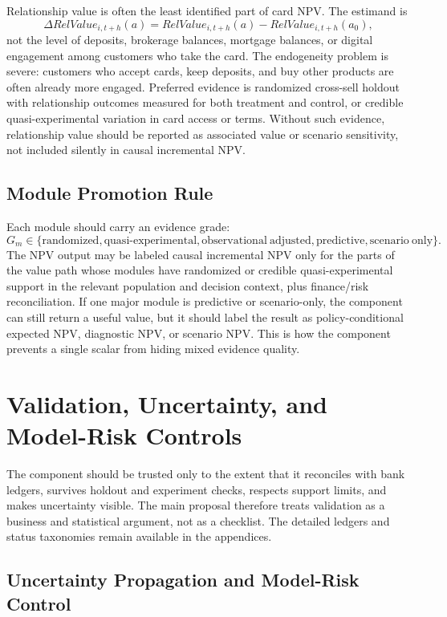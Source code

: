 \documentclass[11pt]{article}
\newcommand{\1}{\mathbf{1}}
\begin{document}
Relationship value is often the least identified part of card NPV. The
estimand is
\[
  \Delta RelValue_{i,t+h}(a)
  =
  RelValue_{i,t+h}(a)-RelValue_{i,t+h}(a_0),
\]
not the level of deposits, brokerage balances, mortgage balances, or digital
engagement among customers who take the card. The endogeneity problem is
severe: customers who accept cards, keep deposits, and buy other products are
often already more engaged. Preferred evidence is randomized cross-sell
holdout with relationship outcomes measured for both treatment and control, or
credible quasi-experimental variation in card access or terms. Without such
evidence, relationship value should be reported as associated value or
scenario sensitivity, not included silently in causal incremental NPV.

\subsection*{Module Promotion Rule}

Each module should carry an evidence grade:
\[
  G_m\in
  \{\mathrm{randomized},\mathrm{quasi\text{-}experimental},
    \mathrm{observational\ adjusted},\mathrm{predictive},
    \mathrm{scenario\ only}\}.
\]
The NPV output may be labeled causal incremental NPV only for the parts of the
value path whose modules have randomized or credible quasi-experimental
support in the relevant population and decision context, plus finance/risk
reconciliation. If one major module is predictive or scenario-only, the
component can still return a useful value, but it should label the result as
policy-conditional expected NPV, diagnostic NPV, or scenario NPV. This is how
the component prevents a single scalar from hiding mixed evidence quality.


\section{Validation, Uncertainty, and Model-Risk Controls}
\label{sec:v4-validation-risk}

The component should be trusted only to the extent that it reconciles with bank
ledgers, survives holdout and experiment checks, respects support limits, and
makes uncertainty visible.  The main proposal therefore treats validation as a
business and statistical argument, not as a checklist.  The detailed ledgers and
status taxonomies remain available in the appendices.

\subsection{Uncertainty Propagation and Model-Risk Control}
\label{sec:uncertainty-propagation}
\end{document}

